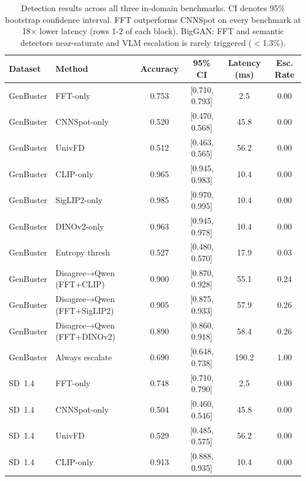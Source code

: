 \documentclass{ieeeaccess}
\begin{document}
\begin{table}[t]
\large
\centering
\caption{Detection results across all three in-domain benchmarks. CI denotes 95\%
bootstrap confidence interval. FFT outperforms CNNSpot on every benchmark at
18$\times$ lower latency (rows 1-2 of each block). BigGAN: FFT and semantic
detectors near-saturate and VLM escalation is rarely triggered ($<$1.3\%).}
\label{tab:main_results}
\begin{tabular}{llcccc}
\toprule
Dataset & Method & Accuracy & 95\% CI & Latency (ms) & Esc. Rate \\
\midrule
GenBuster & FFT-only          & 0.753 & [0.710, 0.793] &  2.5  & 0.00 \\
GenBuster & CNNSpot-only      & 0.520 & [0.470, 0.568] & 45.8  & 0.00 \\
GenBuster & UnivFD            & 0.512 & [0.463, 0.565] & 56.2  & 0.00 \\
GenBuster & CLIP-only         & 0.965 & [0.945, 0.983] & 10.4  & 0.00 \\
GenBuster & SigLIP2-only      & 0.985 & [0.970, 0.995] & 10.4  & 0.00 \\
GenBuster & DINOv2-only       & 0.963 & [0.945, 0.978] & 10.4  & 0.00 \\
GenBuster & Entropy thresh    & 0.527 & [0.480, 0.570] & 17.9  & 0.03 \\
GenBuster & Disagree→Qwen (FFT+CLIP)    & 0.900 & [0.870, 0.928] & 55.1  & 0.24 \\
GenBuster & Disagree→Qwen (FFT+SigLIP2) & 0.905 & [0.875, 0.933] & 57.9  & 0.26 \\
GenBuster & Disagree→Qwen (FFT+DINOv2)  & 0.890 & [0.860, 0.918] & 58.4  & 0.26 \\
GenBuster & Always escalate   & 0.690 & [0.648, 0.738] & 190.2 & 1.00 \\
\midrule
SD~1.4 & FFT-only          & 0.748 & [0.710, 0.790] &  2.5  & 0.00 \\
SD~1.4 & CNNSpot-only      & 0.504 & [0.460, 0.546] & 45.8  & 0.00 \\
SD~1.4 & UnivFD            & 0.529 & [0.485, 0.575] & 56.2  & 0.00 \\
SD~1.4 & CLIP-only         & 0.913 & [0.888, 0.935] & 10.4  & 0.00 \\

\end{tabular}
\end{table}
\end{document}
